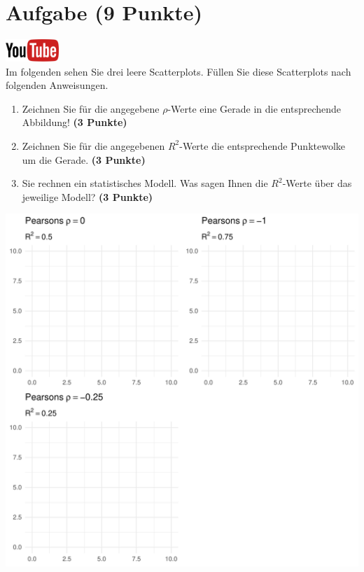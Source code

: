 \documentclass[a4paper, 9pt]{scrartcl}\usepackage[]{graphicx}\usepackage[]{xcolor}
\makeatletter
\def\maxwidth{ %
  \ifdim\Gin@nat@width>\linewidth
    \linewidth
  \else
    \Gin@nat@width
  \fi
}
\makeatother
\begin{document}
\clearpage

\section{Aufgabe \hfill (9 Punkte)}

\hfill\href{https://youtu.be/fB6nF4dxodA}{\includegraphics[width =
  2cm]{img/youtube}}\\[1Ex]


Im folgenden sehen Sie drei leere Scatterplots. F{\"u}llen Sie diese
Scatterplots nach folgenden Anweisungen.

\begin{enumerate}
\item Zeichnen Sie f{\"u}r die angegebene $\rho$-Werte eine Gerade in die
  entsprechende Abbildung! \textbf{(3 Punkte)}
\item Zeichnen Sie f{\"u}r die angegebenen $R^2$-Werte die entsprechende
  Punktewolke um die Gerade. \textbf{(3 Punkte)}
\item Sie rechnen ein statistisches Modell. Was sagen Ihnen die $R^2$-Werte
  {\"u}ber das jeweilige Modell? \textbf{(3 Punkte)}
\end{enumerate}




{\centering \includegraphics[width=\maxwidth]{img/correlation-01-1} 

}
\end{document}

